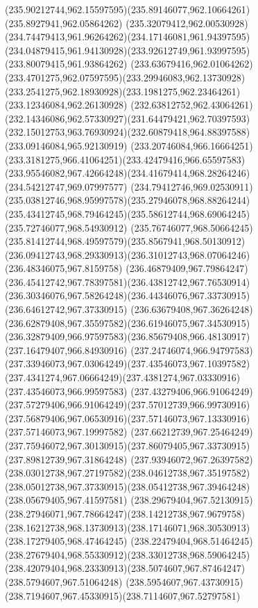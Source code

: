 {{	\curveto(235.90212744,962.15597595)(235.89146077,962.10664261)(235.8927941,962.05864262)
	\curveto(235.32079412,962.00530928)(234.74479413,961.96264262)(234.17146081,961.94397595)
	\curveto(234.04879415,961.94130928)(233.92612749,961.93997595)(233.80079415,961.93864262)
	\curveto(233.63679416,962.01064262)(233.4701275,962.07597595)(233.29946083,962.13730928)
	\curveto(233.2541275,962.18930928)(233.1981275,962.23464261)(233.12346084,962.26130928)
	\curveto(232.63812752,962.43064261)(232.14346086,962.57330927)(231.64479421,962.70397593)
	\curveto(232.15012753,963.76930924)(232.60879418,964.88397588)(233.09146084,965.92130919)
	\curveto(233.20746084,966.16664251)(233.3181275,966.41064251)(233.42479416,966.65597583)
	\curveto(233.95546082,967.42664248)(234.41679414,968.28264246)(234.54212747,969.07997577)
	\curveto(234.79412746,969.02530911)(235.03812746,968.95997578)(235.27946078,968.88264244)
	\curveto(235.43412745,968.79464245)(235.58612744,968.69064245)(235.72746077,968.54930912)
	\curveto(235.76746077,968.50664245)(235.81412744,968.49597579)(235.8567941,968.50130912)
	\curveto(236.09412743,968.29330913)(236.31012743,968.07064246)(236.48346075,967.8159758)
	\curveto(236.46879409,967.79864247)(236.45412742,967.78397581)(236.43812742,967.76530914)
	\curveto(236.30346076,967.58264248)(236.44346076,967.33730915)(236.64612742,967.37330915)
	\curveto(236.63679408,967.36264248)(236.62879408,967.35597582)(236.61946075,967.34530915)
	\curveto(236.32879409,966.97597583)(236.85679408,966.48130917)(237.16479407,966.84930916)
	\curveto(237.24746074,966.94797583)(237.33946073,967.03064249)(237.43546073,967.10397582)
	\curveto(237.4341274,967.06664249)(237.4381274,967.03330916)(237.43546073,966.99597583)
	\curveto(237.43279406,966.91064249)(237.57279406,966.91064249)(237.57012739,966.99730916)
	\curveto(237.56879406,967.06530916)(237.57146073,967.13330916)(237.57146073,967.19997582)
	\curveto(237.66212739,967.25464249)(237.75946072,967.30130915)(237.86079405,967.33730915)
	\lineto(237.89812739,967.31864248)
	\curveto(237.93946072,967.26397582)(238.03012738,967.27197582)(238.04612738,967.35197582)
	\curveto(238.05012738,967.37330915)(238.05412738,967.39464248)(238.05679405,967.41597581)
	\curveto(238.29679404,967.52130915)(238.27946071,967.78664247)(238.14212738,967.9679758)
	\curveto(238.16212738,968.13730913)(238.17146071,968.30530913)(238.17279405,968.47464245)
	\curveto(238.22479404,968.51464245)(238.27679404,968.55330912)(238.33012738,968.59064245)
	\curveto(238.42079404,968.23330913)(238.5074607,967.87464247)(238.5794607,967.51064248)
	\curveto(238.5954607,967.43730915)(238.7194607,967.45330915)(238.7114607,967.52797581)
}}
